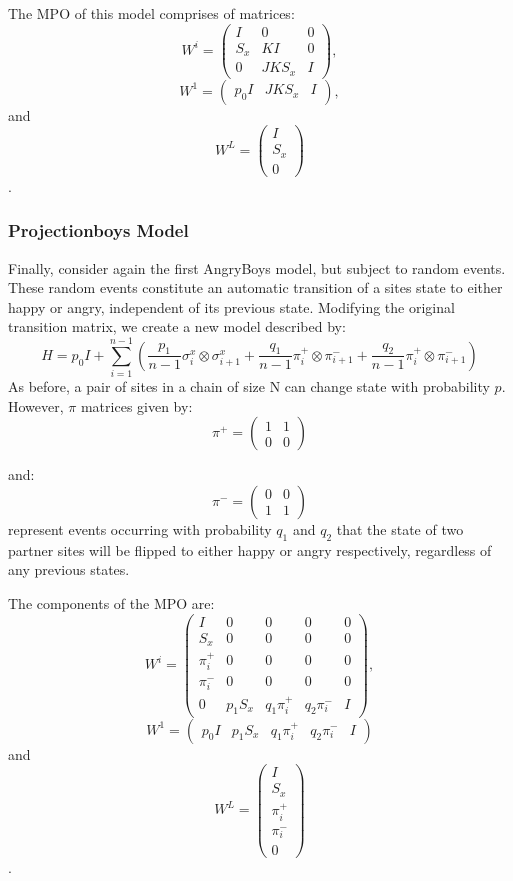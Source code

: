 \documentclass[english]{article}[12pt]
\begin{document}
The MPO of this model comprises of matrices:
$$W^{i}=
\begin{pmatrix}
I & 0 & 0 \\
S_x & K I & 0 \\
0 & J K S_x & I
\end{pmatrix},
$$
$$W^1=\begin{pmatrix}p_0 I & J K S_x & I\end{pmatrix}, $$ 
and 
$$W^L=
\begin{pmatrix}
I \\ S_x \\0
\end{pmatrix}$$.


\subsubsection{Projectionboys Model}
Finally, consider again the first AngryBoys model, but subject to random events. These random events constitute an automatic transition of a sites state to either happy or angry, independent of its previous state. Modifying the original transition matrix, we create a new model described by:
\begin{displaymath}
H = p_0 I +  \sum_{i=1}^{n-1}(\frac{p_1}{n-1}\sigma_i^x\otimes\sigma_{i+1}^x + \frac{q_1}{n-1}\pi_i^+\otimes\pi_{i+1}^- + \frac{q_2}{n-1}\pi_i^+\otimes\pi_{i+1}^-)
\end{displaymath}
As before, a pair of sites in a chain of size N can change state with probability $p$. However, $\pi$ matrices given by:
$$\pi^{+}=
\begin{pmatrix}
1 & 1 \\
0 & 0
\end{pmatrix}$$
 
and:
$$\pi^{-}=
\begin{pmatrix}
0 & 0 \\
1 & 1
\end{pmatrix}$$
represent events occurring with probability $q_{1}$ and $q_{2}$ that the state of two partner sites will be flipped to either happy or angry respectively, regardless of any previous states.


The components of the MPO are:
$$W^{i}=
\begin{pmatrix}
I & 0 & 0 & 0 & 0 \\
S_x & 0 & 0  & 0 & 0 \\
\pi_i^+ & 0 & 0  & 0 & 0 \\
\pi_i^- & 0 & 0  & 0 & 0 \\
0 & p_1 S_x & q_1 \pi_i^+  & q_2 \pi_i^- & I
\end{pmatrix},$$
$$W^1=\begin{pmatrix}p_0 I & p_1 S_x & q_1 \pi_i^+ & q_2 \pi_i^- & I\end{pmatrix}$$ and
$$W^L=
\begin{pmatrix}
I \\ S_x \\ \pi_i^+ \\ \pi_i^- \\ 0
\end{pmatrix}$$.
\end{document}
